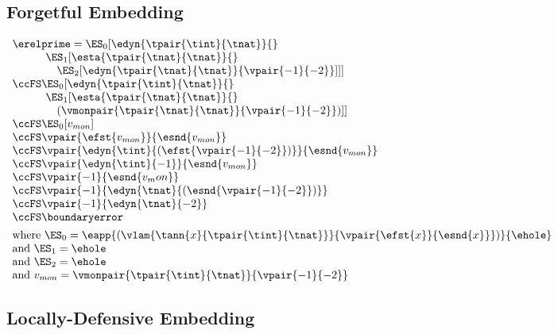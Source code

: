 \subsection{Forgetful Embedding}

$\begin{array}{l}
  \erelprime = \ES_0[\edyn{\tpair{\tint}{\tnat}}{}
\\\qquad\quad \ES_1[\esta{\tpair{\tnat}{\tnat}}{}
\\\qquad\quad\quad \ES_2[\edyn{\tpair{\tnat}{\tnat}}{\vpair{-1}{-2}}]]]
\\\ccFS \ES_0[\edyn{\tpair{\tint}{\tnat}}{}
\\\qquad\quad \ES_1[\esta{\tpair{\tnat}{\tnat}}{}
\\\qquad\quad\quad (\vmonpair{\tpair{\tnat}{\tnat}}{\vpair{-1}{-2}})]]
\\\ccFS \ES_0[v_{mon}]
\\\ccFS \vpair{\efst{v_{mon}}}{\esnd{v_{mon}}}
\\\ccFS \vpair{\edyn{\tint}{(\efst{\vpair{-1}{-2}})}}{\esnd{v_{mon}}}
\\\ccFS \vpair{\edyn{\tint}{{-1}}}{\esnd{v_{mon}}}
\\\ccFS \vpair{{-1}}{\esnd{v_mon}}
\\\ccFS \vpair{{-1}}{\edyn{\tnat}{(\esnd{\vpair{-1}{-2}})}}
\\\ccFS \vpair{{-1}}{\edyn{\tnat}{-2}}
\\\ccFS \boundaryerror
\\[1ex]
  \mbox{where } \ES_0 = \eapp{(\vlam{\tann{x}{\tpair{\tint}{\tnat}}}{\vpair{\efst{x}}{\esnd{x}}})}{\ehole}
\\\mbox{and } \ES_1 = \ehole
\\\mbox{and } \ES_2 = \ehole
\\\mbox{and } v_{mon} = \vmonpair{\tpair{\tint}{\tnat}}{\vpair{-1}{-2}}
\end{array}$

\clearpage
\subsection{Locally-Defensive Embedding}

